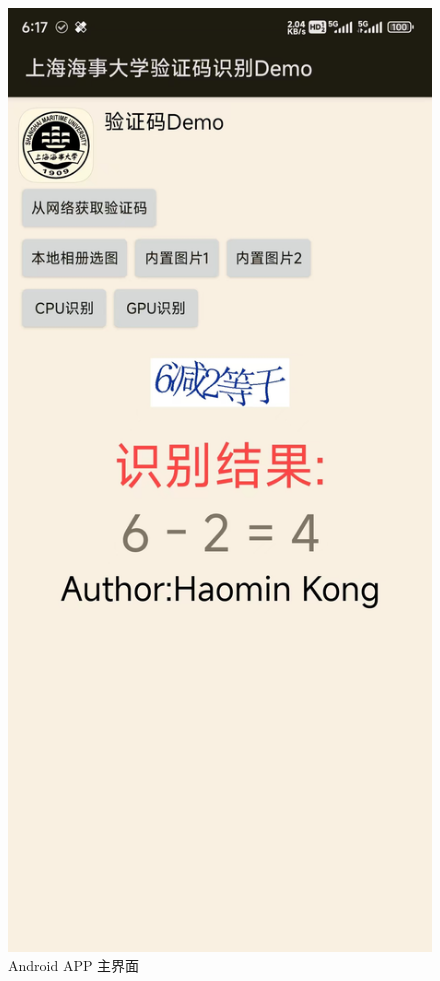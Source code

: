 \begin{figure}
	\centering
	\includegraphics[width=0.6\linewidth]{Resources/Picture/Deploy/Android/activity_main}
	\caption{Android APP 主界面}
	\label{fig:activitymain}
\end{figure}


